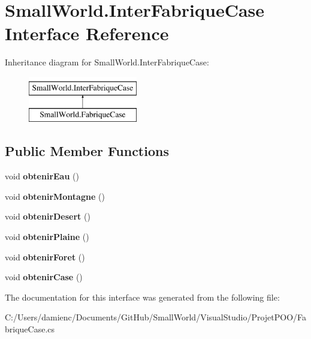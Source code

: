 \hypertarget{interface_small_world_1_1_inter_fabrique_case}{\section{Small\-World.\-Inter\-Fabrique\-Case Interface Reference}
\label{interface_small_world_1_1_inter_fabrique_case}
}
Inheritance diagram for Small\-World.\-Inter\-Fabrique\-Case\-:\begin{figure}[H]
\begin{center}
\leavevmode
\includegraphics[height=2.000000cm]{interface_small_world_1_1_inter_fabrique_case}
\end{center}
\end{figure}
\subsection*{Public Member Functions}
\begin{DoxyCompactItemize}
\item 
\hypertarget{interface_small_world_1_1_inter_fabrique_case_a8827b3bb229ede8581ecf51785782876}{void {\bfseries obtenir\-Eau} ()}\label{interface_small_world_1_1_inter_fabrique_case_a8827b3bb229ede8581ecf51785782876}

\item 
\hypertarget{interface_small_world_1_1_inter_fabrique_case_ac833cd9b6c0db8ec284ef6be12bf8059}{void {\bfseries obtenir\-Montagne} ()}\label{interface_small_world_1_1_inter_fabrique_case_ac833cd9b6c0db8ec284ef6be12bf8059}

\item 
\hypertarget{interface_small_world_1_1_inter_fabrique_case_a0f473bd8a83ba7c92099a43895f741d1}{void {\bfseries obtenir\-Desert} ()}\label{interface_small_world_1_1_inter_fabrique_case_a0f473bd8a83ba7c92099a43895f741d1}

\item 
\hypertarget{interface_small_world_1_1_inter_fabrique_case_af6f2840d1b17aba496fa10f330f99b92}{void {\bfseries obtenir\-Plaine} ()}\label{interface_small_world_1_1_inter_fabrique_case_af6f2840d1b17aba496fa10f330f99b92}

\item 
\hypertarget{interface_small_world_1_1_inter_fabrique_case_a3fbdf7448df49a051d511ad3d76e4d10}{void {\bfseries obtenir\-Foret} ()}\label{interface_small_world_1_1_inter_fabrique_case_a3fbdf7448df49a051d511ad3d76e4d10}

\item 
\hypertarget{interface_small_world_1_1_inter_fabrique_case_ade63a70a9888b35a4208e4ad53ac90b0}{void {\bfseries obtenir\-Case} ()}\label{interface_small_world_1_1_inter_fabrique_case_ade63a70a9888b35a4208e4ad53ac90b0}

\end{DoxyCompactItemize}


The documentation for this interface was generated from the following file\-:\begin{DoxyCompactItemize}
\item 
C\-:/\-Users/damienc/\-Documents/\-Git\-Hub/\-Small\-World/\-Visual\-Studio/\-Projet\-P\-O\-O/Fabrique\-Case.\-cs\end{DoxyCompactItemize}
